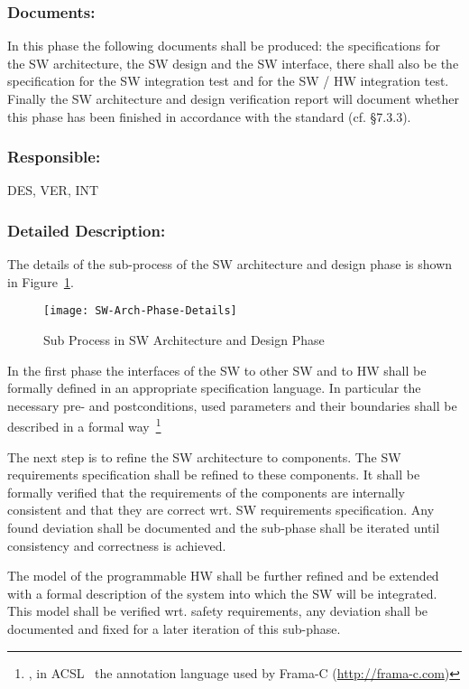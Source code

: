 \subsubsection{Documents:}
\label{sec:sw-arch-documents}
In this phase the following documents shall be produced: the
specifications for the SW architecture, the SW design and the SW interface,
there shall also be the specification for the SW integration test and for the SW
/ HW integration test. Finally the SW architecture and design verification
report will document whether this phase has been finished in accordance with
the standard (cf. §7.3.3).

\subsubsection{Responsible:}
\label{sec:sw-arch-responsible}
DES, VER, INT

\subsubsection{Detailed Description:}
\label{sec:sw-arch-deta-descr}
The details of the sub-process of the SW architecture and design phase is shown
in Figure~\ref{fig:detailed-sw-arch-phase}.

\begin{figure}[ht]
  \centering
  \texttt{[image: SW-Arch-Phase-Details]}
  \caption{Sub Process in SW Architecture and Design Phase}
  \label{fig:detailed-sw-arch-phase}
\end{figure}

In the first phase the interfaces of the SW to other SW and to HW shall be
formally defined in an appropriate specification language. In particular the
necessary pre- and postconditions, used parameters and their boundaries shall be
described in a formal way~\footnote{\eg, in ACSL~\cite{baudin09acsl} the
  annotation language used by Frama-C (\url{http://frama-c.com})}

The next step is to refine the SW architecture to components. The SW
requirements specification shall be refined to these components. It shall be
formally verified that the requirements of the components are internally
consistent and that they are correct wrt. SW requirements specification. Any
found deviation shall be documented and the sub-phase shall be iterated until
consistency and correctness is achieved.

The model of the programmable HW shall be further refined and be extended with a
formal description of the system into which the SW will be integrated. This
model shall be verified wrt. safety requirements, any deviation shall be
documented and fixed for a later iteration of this sub-phase.

